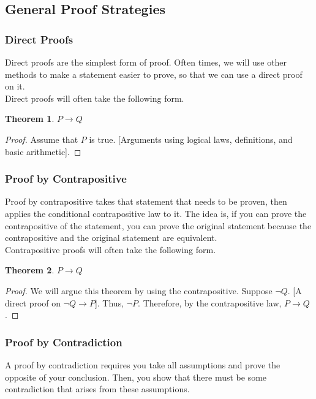 \documentclass{article}
\newtheorem{theorem}{Theorem}[section]
\begin{document}
\subsection{General Proof Strategies}

\subsubsection{Direct Proofs}
Direct proofs are the simplest form of proof. Often times, we will use other methods to 
make a statement easier to prove, so that we can use a direct proof on it. \\

\noindent Direct proofs will often take the following form.
\begin{theorem}
    $P \rightarrow Q$
\end{theorem}
\begin{proof}
    Assume that $P$ is true. [Arguments using logical laws, definitions, and basic arithmetic].
\end{proof}

\subsubsection{Proof by Contrapositive}
Proof by contrapositive takes that statement that needs to be proven, then applies the
conditional contrapositive law to it. The idea is, if you can prove the contrapositive
of the statement, you can prove the original statement because the contrapositive and the
original statement are equivalent. \\

\noindent Contrapositive proofs will often take the following form.
\begin{theorem}
    $P \rightarrow Q$
\end{theorem}
\begin{proof}
    We will argue this theorem by using the contrapositive. Suppose $\neg Q$. [A direct proof on
    $\neg Q \rightarrow P$]. Thus, $\neg P$. Therefore, by the contrapositive law, $P \rightarrow Q$. 
\end{proof}

\subsubsection{Proof by Contradiction}
A proof by contradiction requires you take all assumptions and prove the opposite of your conclusion. Then, you show that there must be some 
contradiction that arises from these assumptions.
\end{document}
